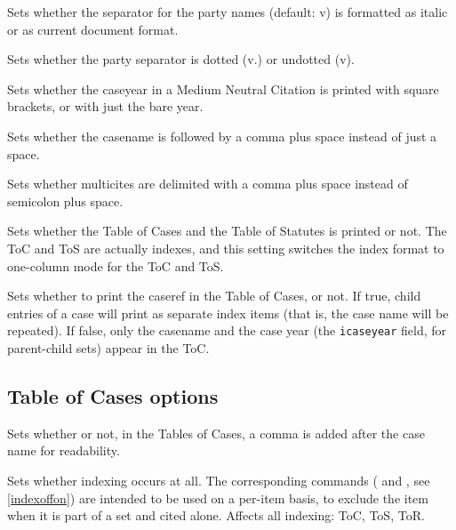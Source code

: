 
Sets whether the separator for the party names (default: v) is formatted as italic or as current document format.
\bigskip


Sets whether the party separator is dotted (v.) or undotted (v).
\bigskip


Sets whether the caseyear in a Medium Neutral Citation is printed with square brackets, or with just the bare year.
\bigskip


Sets whether the casename is followed by a comma plus space instead of just a space.
\bigskip


Sets whether multicites are delimited with a comma plus space instead of semicolon plus space.
\bigskip



Sets whether the Table of Cases and the Table of Statutes is printed or not. The ToC and ToS are actually indexes, and this setting switches the index format to one-column mode for the ToC and ToS.
\bigskip


Sets whether to print the caseref in the Table of Cases, or not. If true, child entries of a case will print as separate index items (that is, the case name will be repeated). If false, only the casename and the case year (the \texttt{icaseyear} field, for parent-child sets) appear in the ToC.
\bigskip


\subsection{Table of Cases options}


Sets whether or not, in the Tables of Cases, a comma is added after the case name for readability.
\bigskip


Sets whether indexing occurs at all. The corresponding commands ( and , see \autoref{indexoffon}) are intended to be used on a per-item basis, to exclude the item when it is part of a set and cited alone. Affects all indexing: ToC, ToS, ToR.
\bigskip


